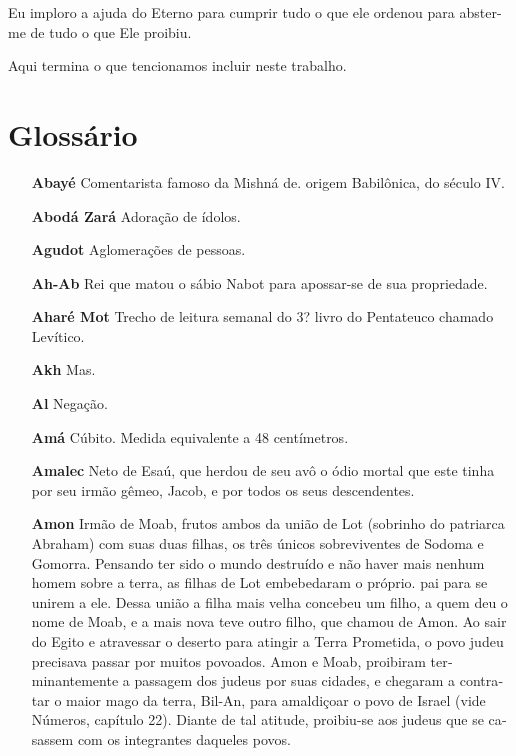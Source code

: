 Eu imploro a ajuda do Eterno para cumprir tudo o que ele ordenou
para abster-me de tudo o que Ele proibiu.

Aqui termina o que tencionamos incluir neste trabalho.


\chapter{Glossário}


  \begingroup\footnotesize
\begin{itemize}

\item[\textbf{Abayé}] Comentarista famoso da Mish­ná de. origem Babilônica,
do século IV.

\item[\textbf{Abodá Zará}] Adoração de ídolos.

\item[\textbf{Agudot}] Aglomerações de pessoas.

\item[\textbf{Ah-Ab}] Rei que matou o sábio Nabot para apossar-se de sua propriedade.

\item[\textbf{Aharé Mot}] Trecho de
leitura sema­nal do 3? livro do Pentateuco chama­do Levítico.

\item[\textbf{Akh}] Mas.

\item[\textbf{Al}] Negação.

\item[\textbf{Amá}] Cúbito. Medida equivalente a 48 centímetros.

\item[\textbf{Amalec}] Neto de Esaú, que herdou de seu avô o ódio mortal que
este tinha por seu irmão gêmeo, Jacob, e por to­dos os seus
descendentes.

\item[\textbf{Amon}] Irmão de Moab, frutos ambos da união de Lot (sobrinho do
patriar­ca Abraham) com suas duas filhas, os três únicos sobreviventes
de Sodoma e Gomorra. Pensando ter sido o mun­do destruído e não haver
mais nenhum homem sobre a terra, as filhas de Lot embebedaram o próprio.
pai para se unirem a ele. Dessa união a filha mais
velha concebeu um filho, a quem deu o nome de Moab, e a mais nova teve
outro filho, que chamou de Amon. Ao sair do Egito e atravessar o deserto
pa­ra atingir a Terra Prometida, o povo ju­deu precisava passar por
muitos po­voados. Amon e Moab, proibiram ter­minantemente a passagem dos
judeus por suas cidades, e chegaram a contra­tar o maior mago da terra,
Bil-An, para amaldiçoar o povo de Israel (vide Nú­meros, capítulo 22).
Diante de tal ati­tude, proibiu-se aos judeus que se ca­sassem com os
integrantes daqueles povos.


\end{itemize}
